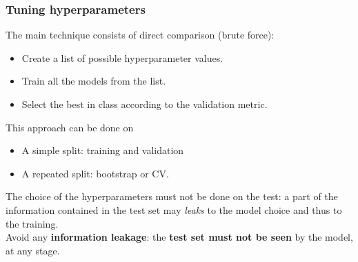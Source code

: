 \begin{frame}
\frametitle{Tuning hyperparameters}
The main technique consists of direct comparison (brute force):
\begin{itemize}
\item Create a list of possible hyperparameter values. 
\item Train all the models from the list.
\item Select the best in class according to the validation metric.
\end{itemize}
This approach can be done on
\begin{itemize}
\item A simple split: training and validation
\item A repeated split: bootstrap or CV.
\end{itemize}
The choice of the hyperparameters must not be done on the test: a part of the information contained in the test set may {\it leaks} to the model choice and thus to the training.\\ 
\vspace{0.3cm}
Avoid any {\bf information leakage}: the {\bf test set must not be seen} by the model, at any stage.
\end{frame}
